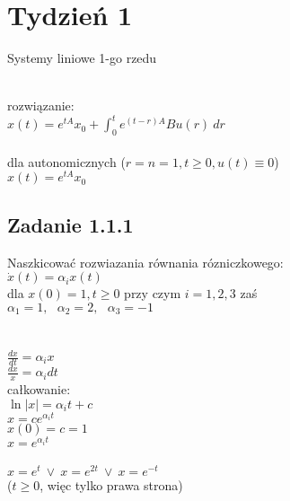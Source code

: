 \pagebreak
\section*{Tydzień 1}
Systemy liniowe 1-go rzedu\\
\begin{figure}[!h]
\end{figure}
\\
rozwiązanie:\\
$x(t)=e^{tA}x_0+\int^t_0e^{(t-r)A}Bu(r) \ dr$\\
\\
dla autonomicznych ($r=n=1, t\geqslant 0, u(t)\equiv 0$)\\
$x(t)=e^{tA}x_0$\\





\pagebreak
\subsection*{Zadanie 1.1.1} {\color{darkgray}
	Naszkicować rozwiazania równania rózniczkowego:\\
	$\dot{x}(t)=\alpha_ix(t)$\\
	dla $x(0)=1, t\geqslant 0$ przy czym $i=1,2,3$ zaś\\
	$\alpha_1=1,  \ \ \ \alpha_2=2, \ \ \ \alpha_3=-1$\\
}\lineh
\\\\
{\color{lightgray}
$\frac{dx}{dt}=\alpha_ix$\\
$\frac{dx}{x}=\alpha_idt$\\
całkowanie:\\
$\ln|x|=\alpha_i t+{c}$\\
}
$x=ce^{\alpha_it}$\\
$x(0)=c=1$\\
$x=e^{\alpha_it}$\\
\\
$x=e^t \ \vee \ x=e^{2t} \ \vee \ x=e^{-t}$\\
($t\geqslant 0$, więc tylko prawa strona)\\

